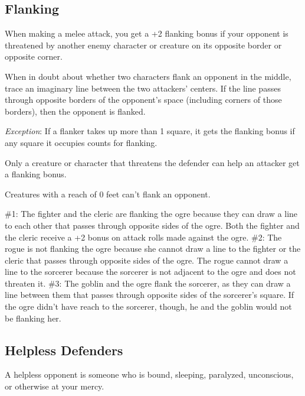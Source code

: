 \subsection{Flanking}

				
When making a melee attack, you get a +2 flanking bonus if your opponent is threatened by another enemy character or creature on its opposite border or opposite corner.
				
When in doubt about whether two characters flank an opponent in the middle, trace an imaginary line between the two attackers' centers. If the line passes through opposite borders of the opponent's space (including corners of those borders), then the opponent is flanked.
				
\textit{Exception}: If a flanker takes up more than 1 square, it gets the flanking bonus if any square it occupies counts for flanking.
				
Only a creature or character that threatens the defender can help an attacker get a flanking bonus.
				
Creatures with a reach of 0 feet can't flank an opponent.

\#1: The fighter and the cleric are flanking the ogre because they can draw a line to each other that passes through opposite sides of the ogre. Both the fighter and the cleric receive a +2 bonus on attack rolls made against the ogre.\newline
\#2: The rogue is not flanking the ogre because she cannot draw a line to the fighter or the cleric that passes through opposite sides of the ogre. The rogue cannot draw a line to the sorcerer because the sorcerer is not adjacent to the ogre and does not threaten it.\newline
\#3: The goblin and the ogre flank the sorcerer, as they can draw a line between them that passes through opposite sides of the sorcerer's square. If the ogre didn't have reach to the sorcerer, though, he and the goblin would not be flanking her.


				
\subsection{Helpless Defenders}

				
A helpless opponent is someone who is bound, sleeping, paralyzed, unconscious, or otherwise at your mercy.
				
